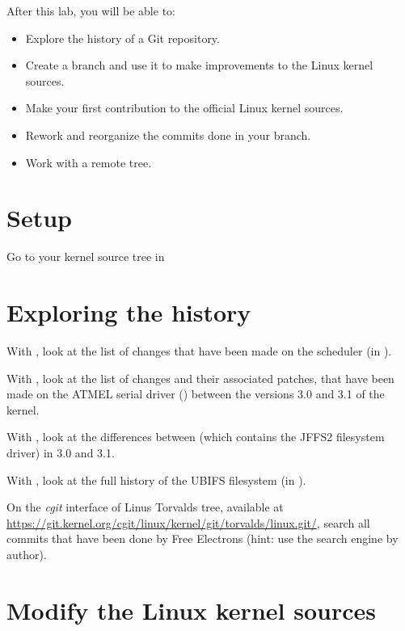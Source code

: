 
After this lab, you will be able to:

\begin{itemize}
\item Explore the history of a Git repository.
\item Create a branch and use it to make improvements to the Linux kernel sources.
\item Make your first contribution to the official Linux kernel sources.
\item Rework and reorganize the commits done in your branch.
\item Work with a remote tree.
\end{itemize}

\section{Setup}

Go to your kernel source tree in 

\section{Exploring the history}

With , look at the list of changes that have been made on the scheduler
(in ).

With , look at the list of changes and their associated
patches, that have been made on the ATMEL serial driver
() between the versions 3.0
and 3.1 of the kernel.

With , look at the differences between 
(which contains the JFFS2 filesystem driver) in 3.0 and 3.1.

With , look at the full history of the UBIFS filesystem (in
).

On the {\em cgit} interface of Linus Torvalds tree, available at
\url{https://git.kernel.org/cgit/linux/kernel/git/torvalds/linux.git/},
search all commits that have been done by Free Electrons (hint: use
the search engine by author).

\section{Modify the Linux kernel sources}

